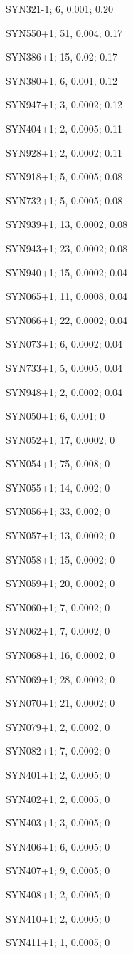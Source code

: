 SYN321-1; 6, 0.001; 0.20

SYN550+1; 51, 0.004; 0.17

SYN386+1; 15, 0.02; 0.17

SYN380+1; 6, 0.001; 0.12

SYN947+1; 3, 0.0002; 0.12

SYN404+1; 2, 0.0005; 0.11

SYN928+1; 2, 0.0002; 0.11

SYN918+1; 5, 0.0005; 0.08

SYN732+1; 5, 0.0005; 0.08

SYN939+1; 13, 0.0002; 0.08

SYN943+1; 23, 0.0002; 0.08

SYN940+1; 15, 0.0002; 0.04

SYN065+1; 11, 0.0008; 0.04

SYN066+1; 22, 0.0002; 0.04

SYN073+1; 6, 0.0002; 0.04

SYN733+1; 5, 0.0005; 0.04

SYN948+1; 2, 0.0002; 0.04

SYN050+1; 6, 0.001; 0

SYN052+1; 17, 0.0002; 0

SYN054+1; 75, 0.008; 0

SYN055+1; 14, 0.002; 0

SYN056+1; 33, 0.002; 0

SYN057+1; 13, 0.0002; 0

SYN058+1; 15, 0.0002; 0

SYN059+1; 20, 0.0002; 0

SYN060+1; 7, 0.0002; 0

SYN062+1; 7, 0.0002; 0

SYN068+1; 16, 0.0002; 0

SYN069+1; 28, 0.0002; 0

SYN070+1; 21, 0.0002; 0

SYN079+1; 2, 0.0002; 0

SYN082+1; 7, 0.0002; 0

SYN401+1; 2, 0.0005; 0

SYN402+1; 2, 0.0005; 0

SYN403+1; 3, 0.0005; 0

SYN406+1; 6, 0.0005; 0

SYN407+1; 9, 0.0005; 0

SYN408+1; 2, 0.0005; 0

SYN410+1; 2, 0.0005; 0

SYN411+1; 1, 0.0005; 0

